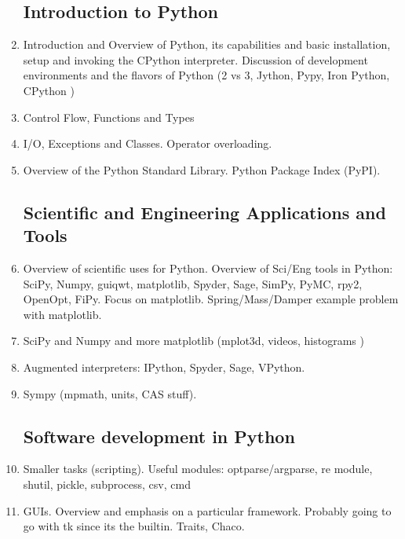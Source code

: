 \documentclass{report}
\begin{document}
\begin{enumerate}

\subsection{Introduction to Python}

    \item Introduction and Overview of Python, its capabilities and basic installation, setup and invoking the CPython interpreter. Discussion of development environments and the flavors of Python (2 vs 3, Jython, Pypy, Iron Python, CPython )

    \item Control Flow, Functions and Types

    \item I/O, Exceptions and Classes. Operator overloading.

    \item Overview of the Python Standard Library. Python Package Index (PyPI).

\subsection{Scientific and Engineering Applications and Tools}
    \item Overview of scientific uses for Python. Overview of Sci/Eng tools in Python: SciPy, Numpy, guiqwt, matplotlib, Spyder, Sage, SimPy, PyMC, rpy2, OpenOpt, FiPy. Focus on matplotlib. Spring/Mass/Damper example problem with matplotlib. 

    \item SciPy and Numpy and more matplotlib (mplot3d, videos, histograms )

    \item Augmented interpreters: IPython, Spyder, Sage, VPython.

    \item Sympy (mpmath, units, CAS stuff).

\subsection{Software development in Python}
    \item Smaller tasks (scripting). Useful modules: optparse/argparse, re module, shutil, pickle, subprocess, csv, cmd

    \item GUIs. Overview and emphasis on a particular framework. Probably going to go with tk since its the builtin. Traits, Chaco.


\end{enumerate}
\end{document}

